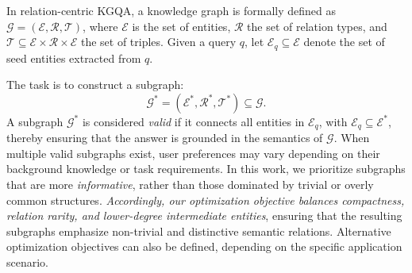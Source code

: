 In relation-centric KGQA, a knowledge graph is formally defined as $\mathcal{G} = (\mathcal{E}, \mathcal{R}, \mathcal{T})$, where $\mathcal{E}$ is the set of entities, $\mathcal{R}$ the set of relation types, and
$\mathcal{T} \subseteq \mathcal{E} \times \mathcal{R} \times \mathcal{E}$ the set of triples. Given a query $q$, let $\mathcal{E}_q \subseteq \mathcal{E}$ denote the set of seed entities extracted from $q$.

The task is to construct a subgraph: 
\small
$$\mathcal{G}^* = (\mathcal{E}^*, \mathcal{R}^*, \mathcal{T}^*) \subseteq \mathcal{G}.$$
\normalsize
A subgraph $\mathcal{G}^*$ is considered \textit{valid} if it connects all entities in $\mathcal{E}_q$, with $\mathcal{E}_q \subseteq \mathcal{E}^*$, thereby ensuring that the answer is grounded in the semantics of $\mathcal{G}$. 
When multiple valid subgraphs exist, user preferences may vary depending on their background knowledge or task requirements.
In this work, we prioritize subgraphs that are more \textit{informative}, rather than those dominated by trivial or overly common structures.
\textit{Accordingly, our optimization objective balances compactness, relation rarity, and lower-degree intermediate entities}, ensuring that the resulting subgraphs emphasize non-trivial and distinctive semantic relations.
Alternative optimization objectives can also be defined, depending on the specific application scenario.

